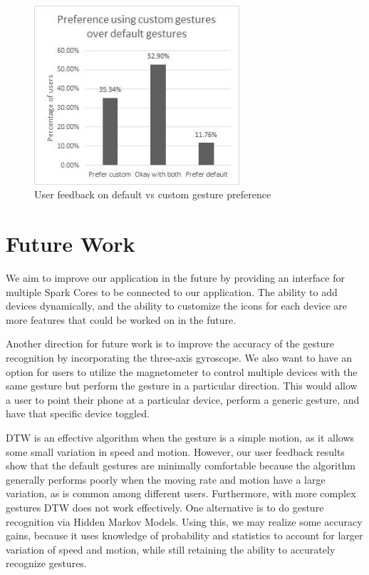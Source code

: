 \documentclass[journal]{IEEEtran}
\begin{document}
\begin{figure}[!t]
\centering
\includegraphics[width=3in]{R6.jpg}
\caption{User feedback on default vs custom gesture preference}
\label{customvsdefault}
\end{figure}


\section{Future Work}
We aim to improve our application in the future by providing an interface for multiple Spark Cores to be connected to our application. The ability to add devices dynamically, and the ability to customize the icons for each device are more features that could be worked on in the future.

Another direction for future work is to improve the accuracy of the gesture recognition by incorporating the three-axis gyroscope. We also want to have an option for users to utilize the magnetometer to control multiple devices with the same gesture but perform the gesture in a particular direction. This would allow a user to point their phone at a particular device, perform a generic gesture, and have that specific device toggled.

DTW is an effective algorithm when the gesture is a simple motion, as it allows some small variation in speed and motion. However, our user feedback results show that the default gestures are minimally comfortable because the algorithm generally performs poorly when the moving rate and motion have a large variation, as is common among different users. Furthermore, with more complex gestures DTW does not work effectively. One alternative is to do gesture recognition via Hidden Markov Models\cite{HMM}. Using this, we may realize some accuracy gains, because it uses knowledge of probability and statistics to account for larger variation of speed and motion, while still retaining the ability to accurately recognize gestures. 
\end{document}
